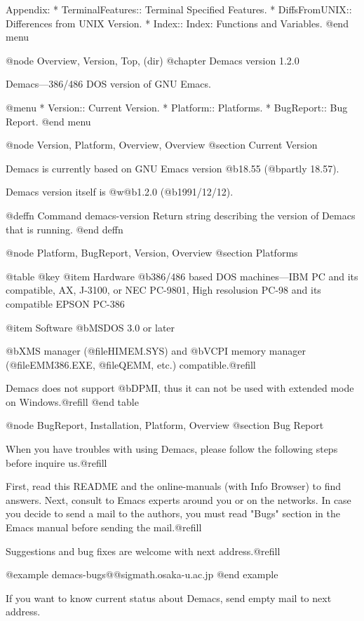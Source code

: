Appendix:
* TerminalFeatures::       Terminal Specified Features.
* DiffsFromUNIX::          Differences from UNIX Version.
* Index::                  Index: Functions and Variables.
@end menu


@node Overview, Version, Top, (dir)
@chapter Demacs version 1.2.0

Demacs---386/486 DOS version of GNU Emacs.

@menu
* Version::    Current Version.
* Platform::   Platforms.
* BugReport::  Bug Report.
@end menu


@node Version, Platform, Overview, Overview
@section Current Version

Demacs is currently based on GNU Emacs version @b{18.55} (@b{partly 18.57}).

Demacs version itself is @w{@b{1.2.0} (@b{1991/12/12})}.

@deffn Command demacs-version
Return string describing the version of Demacs that is running.
@end deffn


@node Platform, BugReport, Version, Overview
@section Platforms

@table @key
@item Hardware
@b{386/486 based DOS machines}---IBM PC and its compatible, AX, J-3100, 
or NEC PC-9801, High resolusion PC-98 and its compatible EPSON PC-386

@item Software
@b{MSDOS 3.0 or later}

@b{XMS} manager (@file{HIMEM.SYS}) and @b{VCPI} memory manager
(@file{EMM386.EXE}, @file{QEMM}, etc.) compatible.@refill

Demacs does not support @b{DPMI}, thus it can not be used with extended
mode on Windows.@refill
@end table


@node BugReport, Installation, Platform, Overview
@section Bug Report

When you have troubles with using Demacs, please follow the following
steps before inquire us.@refill

First, read this README and the online-manuals (with Info Browser) to
find answers. Next, consult to Emacs experts around you or on the
networks. In case you decide to send a mail to the authors, you must
read "Bugs" section in the Emacs manual before sending the mail.@refill

Suggestions and bug fixes are welcome with next address.@refill

@example
demacs-bugs@@sigmath.osaka-u.ac.jp
@end example

If you want to know current status about Demacs, send empty mail to
next address.

